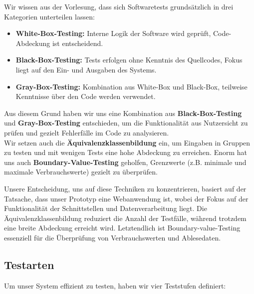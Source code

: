 Wir wissen aus der Vorlesung, dass sich Softwaretests grundsätzlich in drei Kategorien unterteilen lassen:

\begin{itemize}
	\item \textbf{White-Box-Testing:} Interne Logik der Software wird geprüft, Code-Abdeckung ist entscheidend.
	\item \textbf{Black-Box-Testing:} Tests erfolgen ohne Kenntnis des Quellcodes, Fokus liegt auf den Ein- und Ausgaben des Systems.
	\item \textbf{Gray-Box-Testing:} Kombination aus White-Box und Black-Box, teilweise Kenntnisse über den Code werden verwendet.
\end{itemize}

Aus diesem Grund  haben wir uns eine Kombination aus \textbf{Black-Box-Testing} und \textbf{Gray-Box-Testing} entschieden, um die Funktionalität aus Nutzersicht zu prüfen und gezielt Fehlerfälle im Code zu analysieren.\\
Wir setzen auch die \textbf{Äquivalenzklassenbildung} ein, um Eingaben in Gruppen zu testen und mit wenigen Tests eine hohe Abdeckung zu erreichen.
Enorm hat uns auch \textbf{Boundary-Value-Testing} geholfen, Grenzwerte (z.B. minimale und maximale Verbrauchswerte) gezielt zu überprüfen.

Unsere Entscheidung, uns auf diese Techniken zu konzentrieren, basiert auf der Tatsache, dass unser
Prototyp eine Webanwendung ist, wobei der Fokus auf der Funktionalität der Schnittstellen und Datenverarbeitung liegt.
Die Äquivalenzklassenbildung reduziert die Anzahl der Testfälle, während trotzdem eine breite Abdeckung erreicht wird.
Letztendlich ist Boundary-value-Testing essenziell für die Überprüfung von Verbrauchswerten und Ablesedaten.

\subsection{Testarten}\label{subsec:testarten}

Um unser System effizient zu testen, haben wir vier Teststufen definiert:

